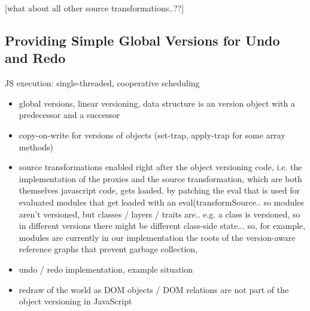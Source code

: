 [what about all other source transformations..??]




\subsection{Providing Simple Global Versions for Undo and Redo}

JS execution: single-threaded, cooperative scheduling 

\begin{itemize}
    \item global versions, linear versioning, data structure is an version object with a predecessor and a successor
    \item copy-on-write for versions of objects (set-trap, apply-trap for some array methods)
\end{itemize}


\begin{itemize}
    \item source transformations enabled right after the object versioning code, i.e. the implementation of the proxies and the source transformation, which are both themselves javascript code, gets loaded. by patching the eval that is used for evaluated modules that get loaded with an eval(transformSource.. so modules aren’t versioned, but classes / layers / traits are.. e.g. a class is versioned, so in different versions there might be different class-side state... so, for example, modules are currently in our implementation the roots of the version-aware reference graphs that prevent garbage collection, 
\end{itemize}


\begin{itemize}
    \item undo / redo implementation, example situation
    \item redraw of the world as DOM objects / DOM relations are not part of the object versioning in JavaScript
\end{itemize}









